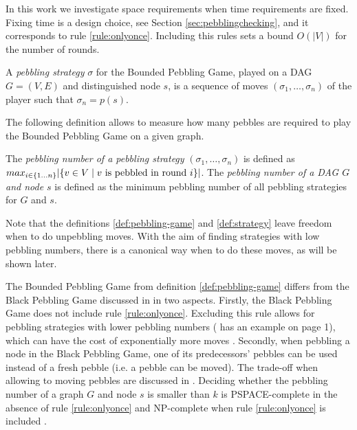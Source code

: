 In this work we investigate space requirements when time requirements are fixed.
Fixing time is a design choice, see Section \ref{sec:pebblingchecking}, and it corresponds to rule \ref{rule:onlyonce}.
Including this rules sets a bound $O(|V|)$ for the number of rounds.

\begin{definition}[Strategy]
\label{def:strategy}
A \emph{pebbling strategy} $\sigma$ for the Bounded Pebbling Game, played on a DAG $G = (V,E)$ and distinguished node $s$, is a sequence of moves $(\sigma_1,\ldots,\sigma_n)$ of the player such that $\sigma_n = p(s)$.
\end{definition}

The following definition allows to measure how many pebbles are required to play the Bounded Pebbling Game on a given graph.

\begin{definition}
The \emph{pebbling number of a pebbling strategy} $(\sigma_1,\ldots,\sigma_n)$ is defined as 
$ max_{i \scriptstyle \in \{1\ldots n\} \displaystyle}|\{ v \in V \mid v \text{ is pebbled in round } i\}| $.
The \emph{pebbling number of a DAG $G$ and node $s$} is defined as the minimum pebbling number of all pebbling strategies for $G$ and $s$.
\end{definition}

Note that the definitions \ref{def:pebbling-game} and \ref{def:strategy} leave freedom when to do unpebbling moves.
With the aim of finding strategies with low pebbling numbers, there is a canonical way when to do these moves, as will be shown later.

\noindent
The Bounded Pebbling Game from definition \ref{def:pebbling-game} differs from the Black Pebbling Game discussed in \cite{Hertel2007,Pippenger1982} in two aspects. 
Firstly, the Black Pebbling Game does not include rule \ref{rule:onlyonce}. 
Excluding this rule allows for pebbling strategies with lower pebbling numbers (\cite{Sethi1975} has an example on page 1), which can have the cost of exponentially more moves \cite{EmdeBoas1979}.
Secondly, when pebbling a node in the Black Pebbling Game, one of its predecessors' pebbles can be used instead of a fresh pebble (i.e. a pebble can be moved). 
The trade-off when allowing to moving pebbles are discussed in \cite{EmdeBoas1979}. 
Deciding whether the pebbling number of a graph $G$ and node $s$ is smaller than $k$ is PSPACE-complete in the absence of rule \ref{rule:onlyonce} \cite{Gilbert1980} and NP-complete when rule \ref{rule:onlyonce} is included \cite{Sethi1975}.

